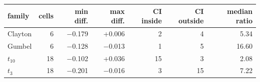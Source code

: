\footnotesize
\begin{tabular}{lrrrrrr}
\toprule
family & cells & min diff. & max diff. & CI inside & CI outside & median ratio \\
\midrule
Clayton & 6 & $-$0.179 & +0.006 & 2 & 4 & 5.34 \\
Gumbel & 6 & $-$0.128 & $-$0.013 & 1 & 5 & 16.60 \\
$t_{10}$ & 18 & $-$0.102 & +0.036 & 15 & 3 & 2.08 \\
$t_3$ & 18 & $-$0.201 & $-$0.016 & 3 & 15 & 7.22 \\
\bottomrule
\end{tabular}

